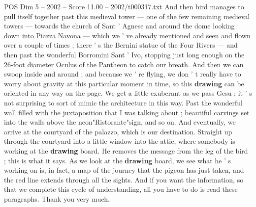 \begin{textsample}{POS Dim 5 – 2002 – Score 11.00 – 2002/t000317.txt}
And then bird manages to pull itself together past this medieval tower — one of the few remaining medieval towers — towards the church of Sant ' Agnese and around the dome looking down into Piazza Navona — which we ' ve already mentioned and seen and flown over a couple of times ; there ' s the Bernini statue of the Four Rivers — and then past the wonderful Borromini Sant ' Ivo, stopping just long enough on the 26-foot diameter Oculus of the Pantheon to catch our breath.
And then we can swoop inside and around ; and because we ' re flying, we don ' t really have to worry about gravity at this particular moment in time, so this \textbf{drawing} can be oriented in any way on the page.
We get a little exuberant as we pass Gesu ; it ' s not surprising to sort of mimic the architecture in this way.
Past the wonderful wall filled with the juxtaposition that I was talking about ; beautiful carvings set into the walls above the neon"Ristorante"sign, and so on.
And eventually, we arrive at the courtyard of the palazzo, which is our destination.
Straight up through the courtyard into a little window into the attic, where somebody is working at the \textbf{drawing} board.
He removes the message from the leg of the bird ; this is what it says.
As we look at the \textbf{drawing} board, we see what he ' s working on is, in fact, a map of the journey that the pigeon has just taken, and the red line extends through all the sights.
And if you want the information, so that we complete this cycle of understanding, all you have to do is read these paragraphs.
Thank you very much.

\end{textsample}
